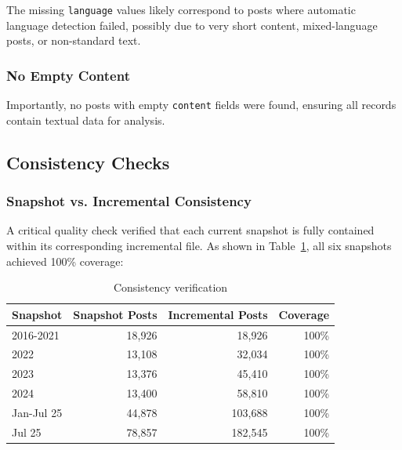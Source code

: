 The missing \texttt{language} values likely correspond to posts where automatic language detection failed, possibly due to very short content, mixed-language posts, or non-standard text.

\subsubsection{No Empty Content}

Importantly, no posts with empty \texttt{content} fields were found, ensuring all records contain textual data for analysis.

\subsection*{Consistency Checks}

\subsubsection{Snapshot vs. Incremental Consistency}

A critical quality check verified that each current snapshot is fully contained within its corresponding incremental file. As shown in Table~\ref{tab:consistency}, all six snapshots achieved 100\% coverage:

\begin{table}[H]
	\centering
	\caption{Consistency verification}
	\label{tab:consistency}
	\begin{tabular}{lrrr}
		\toprule
		\textbf{Snapshot} & \textbf{Snapshot Posts} & \textbf{Incremental Posts} & \textbf{Coverage} \\
		\midrule
		2016-2021         & 18,926                  & 18,926                     & 100\%             \\
		2022              & 13,108                  & 32,034                     & 100\%             \\
		2023              & 13,376                  & 45,410                     & 100\%             \\
		2024              & 13,400                  & 58,810                     & 100\%             \\
		Jan-Jul 25        & 44,878                  & 103,688                    & 100\%             \\
		Jul 25            & 78,857                  & 182,545                    & 100\%             \\
		\bottomrule
	\end{tabular}
\end{table}

